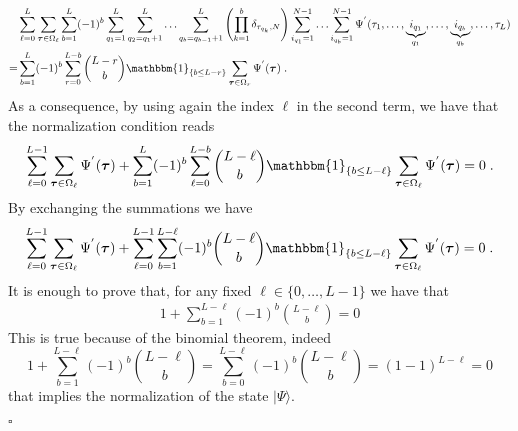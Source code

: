 \documentclass[10pt]{article}
\numberwithin{equation}{section}
\numberwithin{equation}{subsection}
\newcommand{\dt}{\;.}
\begin{document}
	\begin{align}
		&\sum_{\ell=0}^{L}\sum_{\bm{\tau}\in \Omega_{\ell}}\sum_{b=1}^{L}(-1)^{b}\sum_{q_{1}=1}^{L}\sum_{q_{2}=q_{1}+1}^{L}\ldots\sum_{q_{b}=q_{b-1}+1}^{L}\left(\prod_{k=1}^{b}\delta_{\tau_{q_{k}},N}\right)\sum_{i_{q_{1}}=1}^{N-1}\ldots\sum_{i_{q_{b}}=1}^{N-1}\Psi^{'}(\tau_{1},\ldots,\underbrace{i_{q_{1}}}_{q_{1}},\ldots,\underbrace{i_{q_{b}}}_{q_{b}},\ldots,\tau_{L})\nonumber\\
		=&\sum_{b=1}^{L}(-1)^{b}\sum_{r=0}^{L-b}\binom{L-r}{b}\mathbbm{1}_{\{b\leq L-r\}}\sum_{\bm{\tau}\in \Omega_{r}}\Psi^{'}(\bm{\tau})\dt
	\end{align} 
	As a consequence, by using again the index $\ell$ in the second term, we have that the normalization condition reads
	\begin{align}
		\sum_{\ell=0}^{L-1}\sum_{\bm{\tau}\in \Omega_{\ell}}\Psi^{'}(\bm{\tau})+\sum_{b=1}^{L}(-1)^{b}\sum_{\ell=0}^{L-b}\binom{L-\ell}{b}\mathbbm{1}_{\{b\leq L-\ell\}}\sum_{\bm{\tau}\in \Omega_{\ell}}\Psi^{'}(\bm{\tau})=0\dt
	\end{align}
	By exchanging the summations we have 
	\begin{equation}
		\sum_{\ell=0}^{L-1}\sum_{\bm{\tau}\in \Omega_{\ell}}\Psi^{'}(\bm{\tau})+\sum_{\ell=0}^{L-1}\sum_{b=1}^{L-\ell}(-1)^{b}\binom{L-\ell}{b}\mathbbm{1}_{\{b\leq L-\ell\}}\sum_{\bm{\tau}\in \Omega_{\ell}}\Psi^{'}(\bm{\tau})=0\dt
	\end{equation}
	It is enough to prove that, for any fixed $\ell\in\{0,\ldots, L-1\}$ we have that 
	\begin{align}
		1+\sum_{b=1}^{L-\ell}(-1)^{b}\binom{L-\ell}{b}=0
	\end{align}
	This is true because of the binomial theorem, indeed 
	\begin{equation}
		1+\sum_{b=1}^{L-\ell}(-1)^{b}\binom{L-\ell}{b}=\sum_{b=0}^{L-\ell}(-1)^{b}\binom{L-\ell}{b}=(1-1)^{L-\ell}=0
	\end{equation}
	that implies the normalization of the state $|\Psi\rangle$. 
	\begin{flushright}
		$\square$
	\end{flushright}
\end{document}
